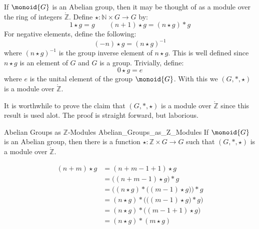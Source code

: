     \begin{example}
        \label{Abelian_Groups_as_Z_Modules}%
        If $\monoid{G}$ is an Abelian group, then it may be thought of as a
        module over the ring of integers $\ring{\mathbb{Z}}$. Define
        $\star:\mathbb{N}\times{G}\rightarrow{G}$ by:
        \begin{equation}
            1\star{g}=g
            \quad\quad
            (n+1)\star{g}=(n\star{g})*g
        \end{equation}
        For negative elements, define the following:
        \begin{equation}
            (\minus{n})\star{g}=(n\star{g})^{\minus{1}}
        \end{equation}
        where $(n\star{g})^{\minus{1}}$ is the group inverse element of
        $n\star{g}$. This is well defined since $n\star{g}$ is an element of $G$
        and $G$ is a group. Trivially, define:
        \begin{equation}
            0\star{g}=e
        \end{equation}
        where $e$ is the unital element of the group $\monoid{G}$. With this we
        $(G,*,\star)$ is a module over $\ring{\mathbb{Z}}$.
    \end{example}
    It is worthwhile to prove the claim that $(G,*,\star)$ is a module over
    $\ring{\mathbb{Z}}$ since this result is used alot. The proof is straight
    forward, but laborious.
    \begin{ftheorem}{Abelian Groups as $\mathbb{Z}$-Modules}
                    {Abelian_Groups_as_Z_Modules}
        If $\monoid{G}$ is an Abelian group, then there is a function
        $\star:\mathbb{Z}\times{G}\rightarrow{G}$ such that
        $(G,*,\star)$ is a module over $\ring{\mathbb{Z}}$.
    \end{ftheorem}
    \begin{subequations}
        \begin{align}
            (n+m)\star{g}&=(n+m-1+1)\star{g}\\
                         &=\big((n+m-1)\star{g}\big)*g\\
                         &=\Big((n\star{g})*\big((m-1)\star{g}\big)\Big)*g\\
                         &=(n\star{g})*\Big(\big((m-1)\star{g})*g\Big)\\
                         &=(n\star{g})*\big((m-1+1)\star{g}\big)\\
                         &=(n\star{g})*(m\star{g})
        \end{align}
    \end{subequations}
